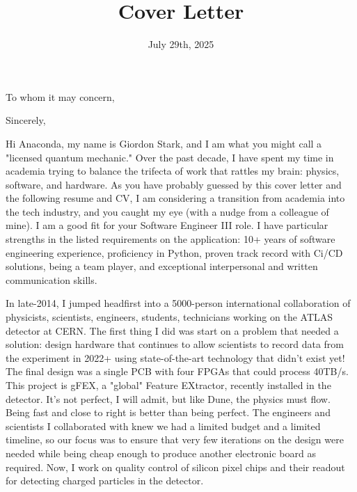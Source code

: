 \documentclass[10pt,letterpaper,sans]{moderncv} %
\title{Cover Letter}
\begin{document}
\date{July 29th, 2025}
\opening{To whom it may concern,}
\closing{Sincerely,}

\makelettertitle
\vspace*{-1em}

Hi Anaconda, my name is Giordon Stark, and I am what you might call a "licensed quantum mechanic." Over the past decade, I have spent my time in academia trying to balance the trifecta of work that rattles my brain: physics, software, and hardware. As you have probably guessed by this cover letter and the following resume and CV, I am considering a transition from academia into the tech industry, and you caught my eye (with a nudge from a colleague of mine). I am a good fit for your Software Engineer III role. I have particular strengths in the listed requirements on the application: 10+ years of software engineering experience, proficiency in Python, proven track record with Ci/CD solutions, being a team player, and exceptional interpersonal and written communication skills.

In late-2014, I jumped headfirst into a 5000-person international collaboration of physicists, scientists, engineers, students, technicians working on the ATLAS detector at CERN. The first thing I did was start on a problem that needed a solution: design hardware that continues to allow scientists to record data from the experiment in 2022+ using state-of-the-art technology that didn't exist yet! The final design was a single PCB with four FPGAs that could process 40TB/s. This project is gFEX, a "global" Feature EXtractor, recently installed in the detector. It's not perfect, I will admit, but like Dune, the physics must flow. Being fast and close to right is better than being perfect. The engineers and scientists I collaborated with knew we had a limited budget and a limited timeline, so our focus was to ensure that very few iterations on the design were needed while being cheap enough to produce another electronic board as required. Now, I work on quality control of silicon pixel chips and their readout for detecting charged particles in the detector.
\end{document}
